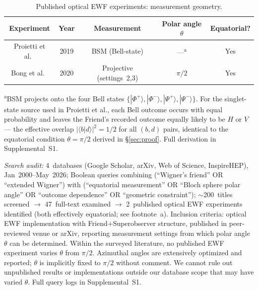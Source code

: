 \documentclass[twocolumn,aps,pra,superscriptaddress,floatfix,10pt]{revtex4-2}
\begin{document}
\begin{table}[H]
\centering
\caption{Published optical EWF experiments: measurement geometry.}
\label{tab:survey}
\begin{tabular}{ccccc}
\toprule
Experiment & Year & Measurement & Polar angle $\theta$ & Equatorial? \\
\midrule
Proietti et al.\ & 2019 & BSM (Bell-state) & ---\textsuperscript{a} & Yes \\
Bong et al.\ & 2020 & Projective (settings~2,3) & $\pi/2$ & Yes \\
\bottomrule
\end{tabular}
\end{table}
\vspace{-0.5em}
{\footnotesize \textsuperscript{a}BSM projects onto the four Bell states $\{|\Phi^+\rangle, |\Phi^-\rangle, |\Psi^+\rangle, |\Psi^-\rangle\}$. For the
singlet-state source used in Proietti et al., each Bell outcome occurs with
equal probability and leaves the Friend's recorded outcome equally likely to
be $H$ or $V$ --- the effective overlap $|\langle b|d\rangle|^2 = 1/2$ for all $(b,d)$ pairs,
identical to the equatorial condition $\theta = \pi/2$ derived in \S\ref{sec:proof}. Full
derivation in Supplemental~S1.\par}

\emph{Search audit:} 4~databases (Google Scholar, arXiv, Web of Science, InspireHEP),
Jan~2000--May~2026; Boolean queries combining (``Wigner's friend'' OR
``extended Wigner'') with (``equatorial measurement'' OR ``Bloch sphere polar
angle'' OR ``outcome dependence'' OR ``geometric constraint''); $\sim$200~titles
screened $\to$ 47~full-text examined $\to$ 2~published optical EWF experiments
identified (both effectively equatorial; see footnote~a). Inclusion
criteria: optical EWF implementation with Friend$+$Superobserver structure,
published in peer-reviewed venue or arXiv, reporting measurement settings
from which polar angle $\theta$ can be determined. Within the surveyed literature,
no published EWF experiment varies $\theta$ from $\pi/2$. Azimuthal angles are
extensively optimized and reported; $\theta$ is implicitly fixed to $\pi/2$ without
comment. We cannot rule out unpublished results or implementations outside
our database scope that may have varied $\theta$. Full query logs in Supplemental~S1.
\end{document}
